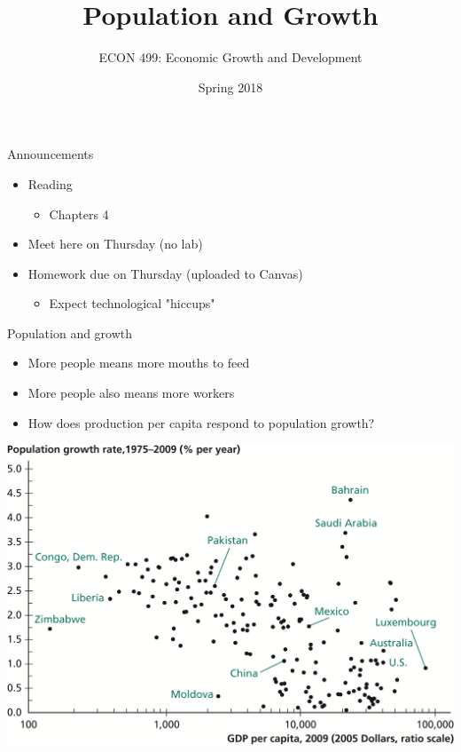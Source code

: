 \documentclass[10pt]{beamer}
\author{ECON 499: Economic Growth and Development}
\date{Spring 2018}
\title{Population and Growth}
\begin{document}
\maketitle

\begin{frame}[label={sec:org419035e}]{}
\alert{Announcements}
\begin{itemize}
\item Reading
\begin{itemize}
\item Chapters 4
\end{itemize}
\item Meet here on Thursday (no lab)
\item Homework due on Thursday (uploaded to Canvas)
\begin{itemize}
\item Expect technological "hiccups"
\end{itemize}
\end{itemize}
\end{frame}

\begin{frame}[label={sec:orgd88e217}]{}
\alert{Population and growth}
\begin{itemize}
\item More people means more mouths to feed
\item More people also means more workers
\item How does production per capita respond to population growth?
\end{itemize}
\end{frame}

\begin{frame}[label={sec:org3290a85}]{}
\begin{center}
\includegraphics[width=.75\textwidth]{./img/4.1.png}
\end{center}
\end{frame}
\end{document}
